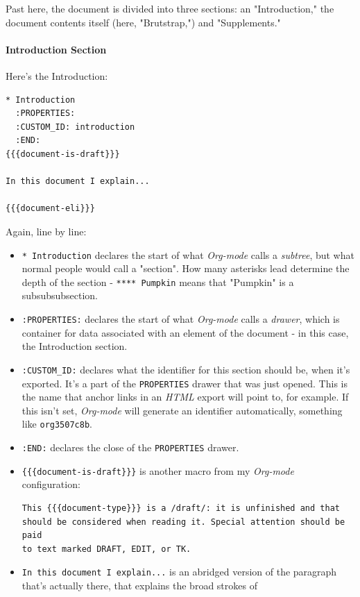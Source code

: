 \documentclass[11pt]{article}
\begin{document}
Past here, the document is divided into three sections: an
"Introduction," the document contents itself (here, "Brutstrap,") and
"Supplements."
\paragraph*{Introduction Section}
\label{sec:orgf860eac}
Here's the Introduction:

\begin{verbatim}
* Introduction
  :PROPERTIES:
  :CUSTOM_ID: introduction
  :END:
{{{document-is-draft}}}

In this document I explain...

{{{document-eli}}}
\end{verbatim}

Again, line by line:

\begin{itemize}
\item \texttt{* Introduction} declares the start of what \emph{Org-mode} calls a
\emph{subtree}, but what normal people would call a "section". How many
asterisks lead determine the depth of the section - \texttt{**** Pumpkin}
means that "Pumpkin" is a subsubsubsection.
\item \texttt{:PROPERTIES:} declares the start of what \emph{Org-mode} calls a
\emph{drawer}, which is container for data associated with an element of
the document - in this case, the Introduction section.
\item \texttt{:CUSTOM\_ID:} declares what the identifier for this section should
be, when it's exported. It's a part of the \texttt{PROPERTIES} drawer that
was just opened. This is the name that anchor links in an \emph{HTML}
export will point to, for example. If this isn't set, \emph{Org-mode}
will generate an identifier automatically, something like
\texttt{org3507c8b}.
\item \texttt{:END:} declares the close of the \texttt{PROPERTIES} drawer.
\item \texttt{\{\{\{document-is-draft\}\}\}} is another macro from my \emph{Org-mode}
configuration:
\begin{verbatim}
This {{{document-type}}} is a /draft/: it is unfinished and that
should be considered when reading it. Special attention should be paid
to text marked DRAFT, EDIT, or TK.
\end{verbatim}
\item \texttt{In this document I explain...} is an abridged version of the
paragraph that's actually there, that explains the broad strokes of

\end{itemize}
\end{document}
